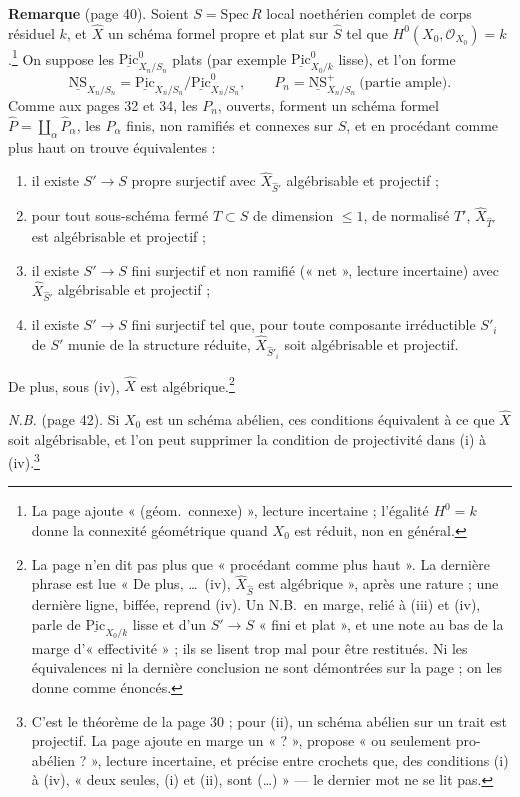 \documentclass[11pt,a4paper]{article}
\begin{document}
\textbf{Remarque} (page 40). Soient $S = \mathrm{Spec}\,R$ local noethérien
complet de corps résiduel $k$, et $\hat X$ un schéma formel propre et plat sur
$\hat S$ tel que $H^0(X_0, \mathcal{O}_{X_0}) = k$.\footnote{La page ajoute
« (géom.\ connexe) », lecture incertaine ; l'égalité $H^0 = k$ donne la
connexité géométrique quand $X_0$ est réduit, non en général.} On suppose les
$\underline{\mathrm{Pic}}^0_{X_n/S_n}$ plats (par exemple
$\underline{\mathrm{Pic}}^0_{X_0/k}$ lisse), et l'on forme
\[
  \underline{\mathrm{NS}}_{X_n/S_n} = \underline{\mathrm{Pic}}_{X_n/S_n} /
  \underline{\mathrm{Pic}}^0_{X_n/S_n}, \qquad
  P_n = \underline{\mathrm{NS}}^+_{X_n/S_n} \ \text{(partie ample)}.
\]
Comme aux pages 32 et 34, les $P_n$, ouverts, forment un schéma formel
$\hat P = \coprod_\alpha \hat P_\alpha$, les $P_\alpha$ finis, non ramifiés
et connexes sur $S$, et en procédant comme plus haut on trouve équivalentes :
\begin{enumerate}
  \item[(i)] il existe $S' \to S$ propre surjectif avec $\hat X_{\hat S'}$
  algébrisable et projectif ;
  \item[(ii)] pour tout sous-schéma fermé $T \subset S$ de dimension $\leq 1$,
  de normalisé $T'$, $\hat X_{\hat T'}$ est algébrisable et projectif ;
  \item[(iii)] il existe $S' \to S$ fini surjectif et non ramifié (« net »,
  lecture incertaine) avec $\hat X_{\hat S'}$ algébrisable et projectif ;
  \item[(iv)] il existe $S' \to S$ fini surjectif tel que, pour toute
  composante irréductible $S'_i$ de $S'$ munie de la structure réduite,
  $\hat X_{\hat S'_i}$ soit algébrisable et projectif.
\end{enumerate}
De plus, sous (iv), $\hat X$ est algébrique.\footnote{La page n'en dit pas
plus que « procédant comme plus haut ». La dernière phrase est lue « De plus,
\ldots\ (iv), $\hat X_{\hat S}$ est algébrique », après une rature ; une
dernière ligne, biffée, reprend (iv). Un N.B.\ en marge, relié à (iii) et
(iv), parle de $\underline{\mathrm{Pic}}_{X_0/k}$ lisse et d'un $S' \to S$
« fini et plat », et une note au bas de la marge d'« effectivité » ; ils se
lisent trop mal pour être restitués. Ni les équivalences ni la dernière
conclusion ne sont démontrées sur la page ; on les donne comme énoncés.}

\emph{N.B.} (page 42). Si $X_0$ est un schéma abélien, ces conditions
équivalent à ce que $\hat X$ soit algébrisable, et l'on peut supprimer la
condition de projectivité dans (i) à (iv).\footnote{C'est le théorème de la
page 30 ; pour (ii), un schéma abélien sur un trait est projectif. La page
ajoute en marge un « ? », propose « ou seulement pro-abélien ? »,
lecture incertaine, et précise entre crochets que, des conditions (i) à (iv),
« deux seules, (i) et (ii), sont (\ldots) » --- le dernier mot ne se lit
pas.}
\end{document}
